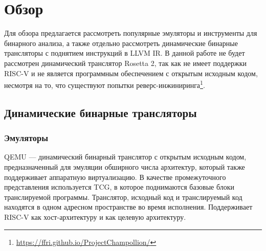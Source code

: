
\section{Обзор}
\label{sec:relatedworks}




Для обзора предлагается рассмотреть популярные эмуляторы и инструменты для бинарного анализа, а также отдельно рассмотреть динамические бинарные трансляторы с поднятием инструкций в LLVM IR. В данной работе не будет рассмотрен динамический транслятор Rosetta 2, так как не имеет поддержки RISC-V и не является программным обеспечением с открытым исходным кодом, несмотря на то, что существуют попытки реверс-инжиниринга\footnote{\href{https://ffri.github.io/ProjectChampollion/}{https://ffri.github.io/ProjectChampollion/}}.

\subsection{Динамические бинарные трансляторы}
\subsubsection{Эмуляторы}
QEMU --- динамический бинарный транслятор с открытым исходным кодом, предназначенный для эмуляции обширного числа архитектур, который также поддерживает аппаратную виртуализацию. В качестве промежуточного представления используется TCG, в которое поднимаются базовые блоки транслируемой программы\cite{10.5555/1247360.1247401}. Транслятор, исходный код и транслируемый код находятся в одном адресном пространстве во время исполнения\cite{10.1145/3381052.3381319}. Поддерживает RISC-V как хост-архитектуру и как целевую архитектуру.

